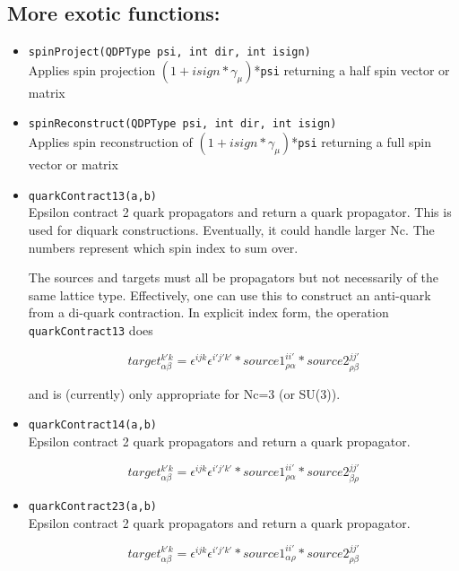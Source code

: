 \documentclass[12pt,letterpaper]{article}
\begin{document}
\medskip

\subsection{More exotic functions:}
\label{sec:otherfuncs}

\begin{itemize}
\item
\verb|spinProject(QDPType psi, int dir, int isign)|\\
Applies spin projection $(1 + isign*\gamma_\mu)$*\verb|psi|
returning a half spin vector or matrix

\item
\verb|spinReconstruct(QDPType psi, int dir, int isign)|\\
Applies spin reconstruction of $(1 + isign*\gamma_\mu)$*\verb|psi|
returning a full spin vector or matrix

\item
\verb|quarkContract13(a,b)|\\
Epsilon contract 2 quark propagators and return a quark propagator.
This is used for diquark constructions. Eventually, it could handle larger
Nc. 
The numbers represent which spin index to sum over.
   
The sources and targets must all be propagators but not
necessarily of the same lattice type. Effectively, one can use
this to construct an anti-quark from a di-quark contraction. In
explicit index form, the operation  \verb|quarkContract13| does

$$target^{k' k}_{\alpha\beta} =
 \epsilon^{i j k}\epsilon^{i' j' k'}* source1^{i i'}_{\rho\alpha}* source2^{j j'}_{\rho\beta}$$
   
and is (currently) only appropriate for Nc=3  (or SU(3)).

\item
\verb|quarkContract14(a,b)|\\
Epsilon contract 2 quark propagators and return a quark propagator.
   
$$target^{k' k}_{\alpha\beta} =
    \epsilon^{i j k}\epsilon^{i' j' k'}*source1^{i i'}_{\rho\alpha}*source2^{j j'}_{\beta\rho}$$

\item
\verb|quarkContract23(a,b)|\\
Epsilon contract 2 quark propagators and return a quark propagator.
   
$$target^{k' k}_{\alpha\beta} =
    \epsilon^{i j k}\epsilon^{i' j' k'}*source1^{i i'}_{\alpha\rho}*source2^{j j'}_{\rho\beta}$$


\end{itemize}
\end{document}
